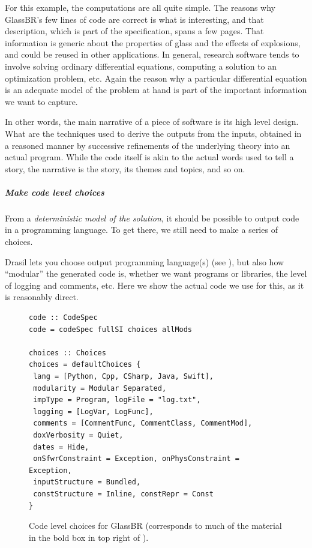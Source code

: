 \documentclass[a4paper,UKenglish,cleveref,autoref,thm-restate]{oasics-v2021}
\begin{document}
For this example, the computations are all quite simple. The reasons why
GlassBR's few lines of code are correct is what is interesting, and that
description, which is part of the specification, spans a few pages. That
information is generic about the properties of glass and the effects of
explosions, and could be reused in other applications.
In general, research software tends to involve
solving ordinary differential equations, computing a solution to
an optimization problem, etc. Again the reason why a particular differential
equation is an adequate model of the problem at hand is part of the
important information we want to capture.

In other words, the main narrative of a piece of software is its high level
design. What are the techniques used to derive the outputs from the inputs,
obtained in a reasoned manner by successive refinements of the underlying
theory into an actual program. While the code itself is akin to the actual
words used to tell a story, the narrative is the story, its themes
and topics, and so on.

\subparagraph*{Make code level choices}
From a \emph{deterministic model of the solution}, it should be
possible to output code in a programming language. To get there, we still need
to make a series of choices.

Drasil lets you choose output programming language(s) (see
), but also how ``modular'' the generated code is, whether
we want programs or libraries, the level of logging and comments, etc. Here we
show the actual code we use for this, as it is reasonably direct.

\begin{figure}[htb]
\begin{lstlisting}
code :: CodeSpec
code = codeSpec fullSI choices allMods

choices :: Choices
choices = defaultChoices {
 lang = [Python, Cpp, CSharp, Java, Swift], 
 modularity = Modular Separated,
 impType = Program, logFile = "log.txt", 
 logging = [LogVar, LogFunc],
 comments = [CommentFunc, CommentClass, CommentMod], 
 doxVerbosity = Quiet,
 dates = Hide, 
 onSfwrConstraint = Exception, onPhysConstraint = Exception,
 inputStructure = Bundled, 
 constStructure = Inline, constRepr = Const
}
\end{lstlisting}
  \caption{Code level choices for GlassBR (corresponds to much of the material
  in the bold box in top right of ).}
  \label{fig:CodeChoices}
\end{figure}
\end{document}

